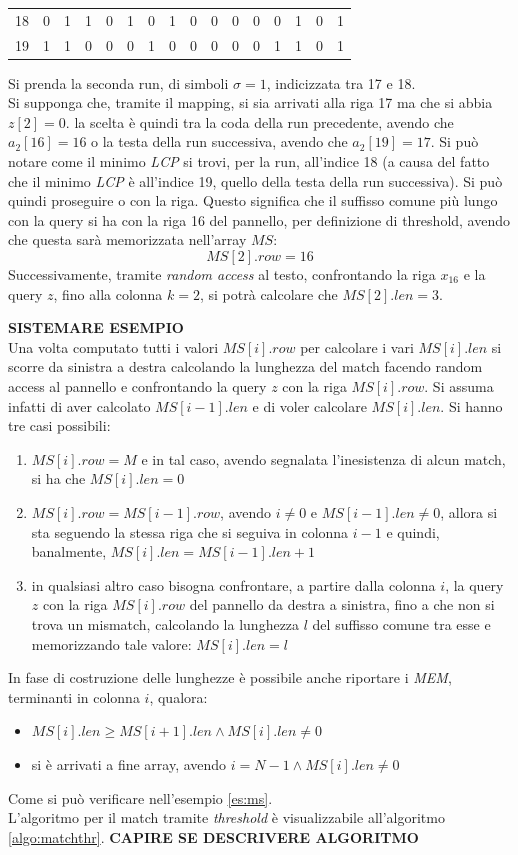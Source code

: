 \begin{esempio}
\begin{table}[H]
\begin{tabular}{c|cc|c|cccccccccccc}
      18 & 0 & 1 & 1 & 0 & 1 & 0 & 1 & 0 & 0 & 0 & 0 & 0 & 1 & 0 & 1 \\
      19 & 1 & 1 & 0 & 0 & 0 & 1 & 0 & 0 & 0 & 0 & 0 & 1 & 1 & 0 & 1 \\
    \end{tabular}
  \end{table}
  Si prenda la seconda run, di simboli $\sigma=1$, indicizzata tra 17 e 18. \\
  Si supponga che, tramite il mapping, si sia arrivati alla riga 17 ma che si
  abbia $z[2]=0$. la scelta è quindi tra la coda della run precedente, avendo
  che $a_2[16]=16$ o la testa della run successiva, avendo che $a_2[19]=17$. Si
  può notare come il minimo \textit{LCP} si trovi, per la 
  run, all'indice 18 (a causa del fatto che il minimo \textit{LCP} è all'indice
  19, quello della testa della run successiva). Si può quindi proseguire o con
  la riga. Questo significa che il suffisso comune più lungo con la query si ha
  con la riga 16 del pannello, per definizione di threshold, avendo che questa
  sarà memorizzata nell'array $MS$:
  \[MS[2].row=16\]
  Successivamente, tramite \textit{random access} al testo, confrontando la riga
  $x_{16}$ e la query $z$, fino alla colonna $k=2$, si potrà calcolare che
  $MS[2].len=3$. 
\end{esempio}
\textbf{SISTEMARE ESEMPIO}\\
Una volta computato tutti i valori $MS[i].row$ per calcolare i vari $MS[i].len$
si scorre da sinistra a destra calcolando la lunghezza del match facendo random
access al pannello e confrontando la query $z$ con la riga $MS[i].row$. Si
assuma infatti di aver calcolato $MS[i-1].len$ e di voler calcolare $MS[i].len$.
Si hanno tre casi possibili:
\begin{enumerate}
  \item $MS[i].row=M$ e in tal caso, avendo segnalata l'inesistenza di alcun
  match, si ha che $MS[i].len=0$
  \item $MS[i].row=MS[i-1].row$, avendo $i\neq 0$ e $MS[i-1].len\neq 0$, allora
  si sta seguendo la stessa riga che si seguiva in colonna $i-1$ e quindi,
  banalmente, $MS[i].len=MS[i-1].len+1$
  \item in qualsiasi altro caso bisogna confrontare, a partire dalla colonna
  $i$, la query 
  $z$ con la riga $MS[i].row$ del pannello da destra a sinistra, fino a che non
  si trova un mismatch, calcolando la lunghezza $l$ del suffisso comune tra esse
  e memorizzando tale valore: $MS[i].len=l$
\end{enumerate}
In fase di costruzione delle lunghezze è possibile anche riportare i
\textit{MEM}, terminanti in colonna $i$, qualora:
\begin{itemize}
  \item $MS[i].len\geq MS[i+1].len \land MS[i].len\neq 0$
  \item si è arrivati a fine array, avendo $i=N-1\land MS[i].len\neq 0$
\end{itemize}
Come si può verificare nell'esempio \ref{es:ms}.\\
L'algoritmo per il match tramite \textit{threshold} è visualizzabile
all'algoritmo \ref{algo:matchthr}.
\textbf{CAPIRE SE DESCRIVERE ALGORITMO}
